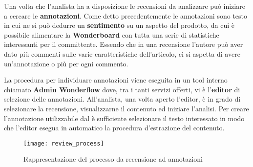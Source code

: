 Una volta che l'analista ha a disposizione le recensioni da analizzare può
iniziare a cercare le \textbf{annotazioni}. Come detto precedentemente le
annotazioni sono testo in cui ne si può dedurre un \textbf{sentimento} su un
aspetto del prodotto, da cui è possibile alimentare la \textbf{Wonderboard} con
tutta una serie di statistiche interessanti per il committente.
Essendo che in una recensione l'autore può aver dato più commenti sulle varie
caratteristiche dell'articolo, ci si aspetta di avere un'annotazione o più per
ogni commento.

La procedura per individuare annotazioni viene eseguita in un tool interno
chiamato \textbf{Admin Wonderflow} dove, tra i tanti servizi offerti, vi è
l'\textbf{editor} di selezione delle annotazioni. All'analista, una volta aperto
l'editor, è in grado di selezionare la recensione, visualizzarne il contenuto ed
iniziare l'analisi. Per creare l'annotazione utilizzabile dal è sufficiente
selezionare il testo interessato in modo che l'editor esegua in automatico la
procedura d'estrazione del contenuto. 

\begin{figure}[ht]
\begin{center}
\texttt{[image: review\_process]}
\caption{Rappresentazione del processo da recensione ad annotazioni}
\label{fig:review_process}
\end{center}
\end{figure}
